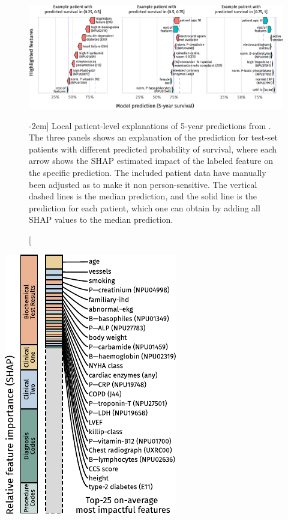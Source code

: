 \begin{figure}[t]
    \includegraphics[trim=8mm 5mm 4mm 0]{graphics/pmhnet-v1-shap-individual.pdf}
    \caption[Example patient-level \acs{SHAP} explanations][-2em]{%
        Local patient-level  explanations of 
        5-year predictions from . The three panels shows
        an explanation of the  prediction for test-set patients
        with different predicted probability of survival, where 
        each arrow shows the \ac{SHAP} estimated impact of the labeled
        feature on the specific prediction.
        The included patient data have manually been adjusted as to 
        make it non person-sensitive. 
        The vertical dashed lines is the median prediction, and 
        the solid line is the prediction for each patient, which 
        one can obtain by adding all \ac{SHAP} values to the 
        median prediction.}
    \label{fig:shap-individual}
\end{figure}%

\begin{marginfigure}[-5em]
    \includegraphics[trim=0 0 0 0]{graphics/pmhnet-v1-feature-impact.pdf}
    \caption[Overview of average feature impact]{%
        By summarising the magnitude of  values, we obtained
        an overview of the relative impact of the different  features,
        either aggregated across feature categories (left) or 
        across each individual features (right). 
    }
    \label{fig:shap-overview}
\end{marginfigure}%

